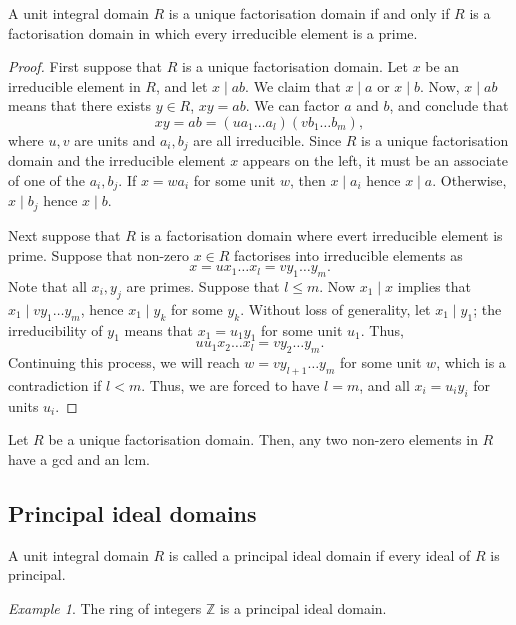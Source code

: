 \documentclass[11pt]{article}
\newcommand{\Z}{\mathbb{Z}}
\theoremstyle{definition}
\theoremstyle{remark}
\newtheorem*{example}{Example}
\numberwithin{equation}{section}
\begin{document}
    \begin{theorem}
        A unit integral domain $R$ is a unique factorisation domain if and only if
        $R$ is a factorisation domain in which every irreducible element is a prime.
    \end{theorem}
    \begin{proof}
        First suppose that $R$ is a unique factorisation domain. Let $x$ be an
        irreducible element in $R$, and let $x \mid ab$. We claim that $x\mid a$ or
        $x \mid b$. Now, $x \mid ab$ means that there exists $y \in R$, $xy = ab$. We
        can factor $a$ and $b$, and conclude that \[
            xy = ab = (ua_1\dots a_l)(vb_1\dots b_m),
        \] where $u, v$ are units and $a_i, b_j$ are all irreducible. Since $R$ is a
        unique factorisation domain and the irreducible element $x$ appears on the
        left, it must be an associate of one of the $a_i, b_j$. If $x = wa_i$ for
        some unit $w$, then $x\mid a_i$ hence $x\mid a$. Otherwise, $x\mid b_j$ hence
        $x\mid b$.

        Next suppose that $R$ is a factorisation domain where evert irreducible
        element is prime. Suppose that non-zero $x \in R$ factorises into
        irreducible elements as \[
            x = ux_1\dots x_l = vy_1\dots y_m.
        \] Note that all $x_i, y_j$ are primes. Suppose that $l \leq m$. Now $x_1 \mid
        x$ implies that $x_1 \mid vy_1 \dots y_m$, hence $x_1 \mid y_k$ for some
        $y_k$. Without loss of generality, let $x_1 \mid y_1$; the irreducibility of
        $y_1$ means that $x_1 = u_1y_1$ for some unit $u_1$. Thus, \[
            uu_1x_2 \dots x_l = vy_2 \dots y_m.
        \] Continuing this process, we will reach $w = vy_{l + 1} \dots y_m$ for some
        unit $w$, which is a contradiction if $l < m$. Thus, we are forced to have $l
        = m$, and all $x_i = u_iy_i$ for units $u_i$.
    \end{proof}

    \begin{lemma}
        Let $R$ be a unique factorisation domain. Then, any two non-zero elements in
        $R$ have a gcd and an lcm.
    \end{lemma}


    \subsection{Principal ideal domains}

    \begin{definition}
        A unit integral domain $R$ is called a principal ideal domain if every ideal
        of $R$ is principal.
    \end{definition}
    \begin{example}
        The ring of integers $\Z$ is a principal ideal domain.
    \end{example}
\end{document}
